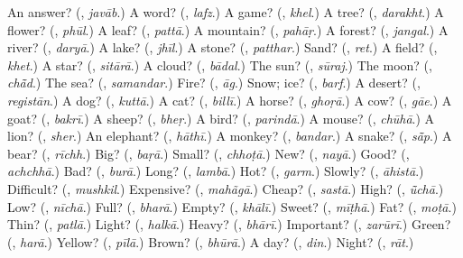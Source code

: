 \begin{tcolorbox}[breakable,colback=teal!4,colframe=teal!35!black,title={Before you move on}]
An answer? (\textbf{}, \emph{javāb}.) A word? (\textbf{}, \emph{lafz}.) A game? (\textbf{}, \emph{khel}.) A tree? (\textbf{}, \emph{darakht}.) A flower? (\textbf{}, \emph{phūl}.) A leaf? (\textbf{}, \emph{pattā}.) A mountain? (\textbf{}, \emph{pahāṛ}.) A forest? (\textbf{}, \emph{jangal}.) A river? (\textbf{}, \emph{daryā}.) A lake? (\textbf{}, \emph{jhīl}.) A stone? (\textbf{}, \emph{patthar}.) Sand? (\textbf{}, \emph{ret}.) A field? (\textbf{}, \emph{khet}.) A star? (\textbf{}, \emph{sitārā}.) A cloud? (\textbf{}, \emph{bādal}.) The sun? (\textbf{}, \emph{sūraj}.) The moon? (\textbf{}, \emph{chā̃d}.) The sea? (\textbf{}, \emph{samandar}.) Fire? (\textbf{}, \emph{āg}.) Snow; ice? (\textbf{}, \emph{barf}.) A desert? (\textbf{}, \emph{registān}.) A dog? (\textbf{}, \emph{kuttā}.) A cat? (\textbf{}, \emph{billī}.) A horse? (\textbf{}, \emph{ghoṛā}.) A cow? (\textbf{}, \emph{gāe}.) A goat? (\textbf{}, \emph{bakrī}.) A sheep? (\textbf{}, \emph{bheṛ}.) A bird? (\textbf{}, \emph{parindā}.) A mouse? (\textbf{}, \emph{chūhā}.) A lion? (\textbf{}, \emph{sher}.) An elephant? (\textbf{}, \emph{hāthī}.) A monkey? (\textbf{}, \emph{bandar}.) A snake? (\textbf{}, \emph{sā̃p}.) A bear? (\textbf{}, \emph{rīchh}.) Big? (\textbf{}, \emph{baṛā}.) Small? (\textbf{}, \emph{chhoṭā}.) New? (\textbf{}, \emph{nayā}.) Good? (\textbf{}, \emph{achchhā}.) Bad? (\textbf{}, \emph{burā}.) Long? (\textbf{}, \emph{lambā}.) Hot? (\textbf{}, \emph{garm}.) Slowly? (\textbf{}, \emph{āhistā}.) Difficult? (\textbf{}, \emph{mushkil}.) Expensive? (\textbf{}, \emph{mahãgā}.) Cheap? (\textbf{}, \emph{sastā}.) High? (\textbf{}, \emph{ū̃chā}.) Low? (\textbf{}, \emph{nīchā}.) Full? (\textbf{}, \emph{bharā}.) Empty? (\textbf{}, \emph{khālī}.) Sweet? (\textbf{}, \emph{mīṭhā}.) Fat? (\textbf{}, \emph{moṭā}.) Thin? (\textbf{}, \emph{patlā}.) Light? (\textbf{}, \emph{halkā}.) Heavy? (\textbf{}, \emph{bhārī}.) Important? (\textbf{}, \emph{zarūrī}.) Green? (\textbf{}, \emph{harā}.) Yellow? (\textbf{}, \emph{pīlā}.) Brown? (\textbf{}, \emph{bhūrā}.) A day? (\textbf{}, \emph{din}.) Night? (\textbf{}, \emph{rāt}.)
\end{tcolorbox}
